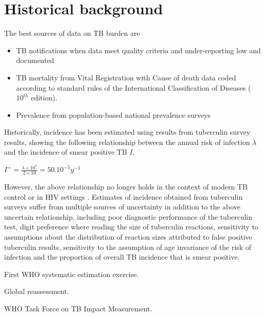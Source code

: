 \section{Historical background}

The best sources of data on TB burden are 
\begin{itemize}
\item TB notifications when data meet quality criteria and under-reporting low and documented
\item TB mortality from Vital Registration with Cause of death data coded according to standard rules of the International Classification of Diseases ($10^{th}$ edition).
\item Prevalence from population-based national prevalence surveys
\end{itemize}

Historically, incidence has been estimated using results from tuberculin survey results\cite{Styblo1985}, showing the following relationship between the annual risk of infection $\lambda$ and the incidence of smear positive TB $I$.

$I^+ = \frac{\lambda \times 10^5}{2 \times 10} = 50.10^{-5} y^{-1}$

However, the above relationship no longer holds in the context of modern TB control or in HIV settings \cite{18235886}. Estimates of incidence obtained from tuberculin surveys suffer from multiple sources of uncertainty in addition to the above uncertain relationship, including poor diagnostic performance of the tuberculin test, digit preference where reading the size of tuberculin reactions, sensitivity to assumptions about the distribution of reaction sizes attributed to false positive tuberculin results, sensitivity to the assumption of age invariance of the risk of infection and the proportion of overall TB incidence that is smear positive. 

First WHO systematic estimation exercise\cite{1600578}.

Global reassessment\cite{10517722}.

WHO Task Force on TB Impact Measurement\cite{18201929}.



  
  
  
  
  
  
  
  
  
  
  